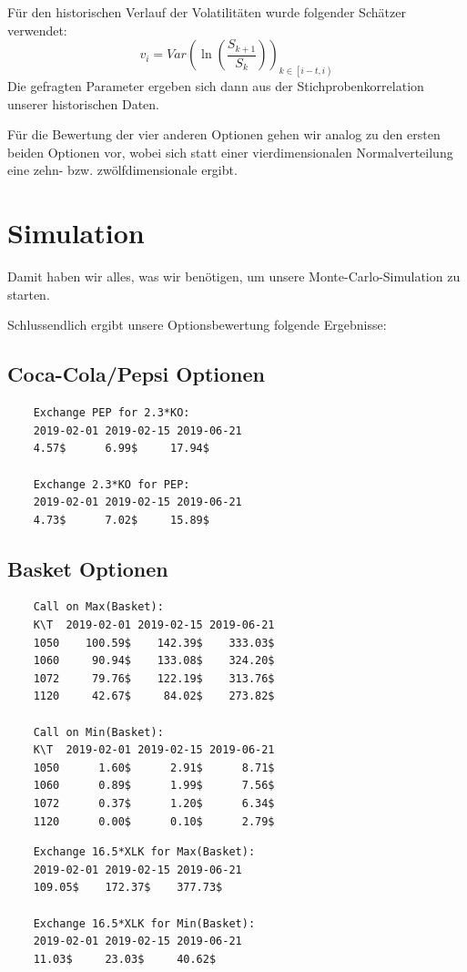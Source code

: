 \documentclass[12pt]{article}
\begin{document}
	Für den historischen Verlauf der Volatilitäten wurde folgender Schätzer verwendet:
	\begin{equation*}
	v_i=Var\left(\ln\left(\frac{S_{k+1}}{S_k}\right)\right)_{k\in\left[i-t,i\right)}
	\end{equation*}
	Die gefragten Parameter ergeben sich dann aus der Stichprobenkorrelation unserer historischen Daten.
	
	Für die Bewertung der vier anderen Optionen gehen wir analog zu den ersten beiden Optionen vor, wobei sich statt einer vierdimensionalen Normalverteilung eine zehn- bzw. zwölfdimensionale ergibt.
	
	
	
	\section*{Simulation}
	
	Damit haben wir alles, was wir benötigen, um unsere Monte-Carlo-Simulation zu starten.
	
	
	
	Schlussendlich ergibt unsere Optionsbewertung folgende Ergebnisse:
	\subsection*{Coca-Cola/Pepsi Optionen}
	
	\begin{verbatim}
	Exchange PEP for 2.3*KO:
	2019-02-01 2019-02-15 2019-06-21
	4.57$      6.99$     17.94$ 
	
	Exchange 2.3*KO for PEP:
	2019-02-01 2019-02-15 2019-06-21
	4.73$      7.02$     15.89$
	\end{verbatim}
	
	
	\subsection*{Basket Optionen}
	
	
	
	\begin{verbatim}
	Call on Max(Basket):
	K\T  2019-02-01 2019-02-15 2019-06-21
	1050    100.59$    142.39$    333.03$ 
	1060     90.94$    133.08$    324.20$ 
	1072     79.76$    122.19$    313.76$ 
	1120     42.67$     84.02$    273.82$ 
	
	Call on Min(Basket):
	K\T  2019-02-01 2019-02-15 2019-06-21
	1050      1.60$      2.91$      8.71$ 
	1060      0.89$      1.99$      7.56$ 
	1072      0.37$      1.20$      6.34$ 
	1120      0.00$      0.10$      2.79$ 
	\end{verbatim}
	\pagebreak
	\begin{verbatim}
	Exchange 16.5*XLK for Max(Basket):
	2019-02-01 2019-02-15 2019-06-21
	109.05$    172.37$    377.73$ 
	
	Exchange 16.5*XLK for Min(Basket):
	2019-02-01 2019-02-15 2019-06-21
	11.03$     23.03$     40.62$ 
	\end{verbatim}
\end{document}
